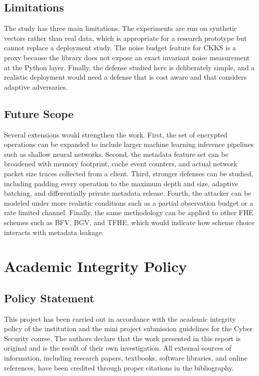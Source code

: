 \documentclass[12pt,a4paper]{article}
\begin{document}
\subsection{Limitations}
The study has three main limitations. The experiments are run on synthetic vectors rather than real data, which is appropriate for a research prototype but cannot replace a deployment study. The noise budget feature for CKKS is a proxy because the library does not expose an exact invariant noise measurement at the Python layer. Finally, the defense studied here is deliberately simple, and a realistic deployment would need a defense that is cost aware and that considers adaptive adversaries.

\subsection{Future Scope}
Several extensions would strengthen the work. First, the set of encrypted operations can be expanded to include larger machine learning inference pipelines such as shallow neural networks. Second, the metadata feature set can be broadened with memory footprint, cache event counters, and actual network packet size traces collected from a client. Third, stronger defenses can be studied, including padding every operation to the maximum depth and size, adaptive batching, and differentially private metadata release. Fourth, the attacker can be modeled under more realistic conditions such as a partial observation budget or a rate limited channel. Finally, the same methodology can be applied to other FHE schemes such as BFV, BGV, and TFHE, which would indicate how scheme choice interacts with metadata leakage.

\section{Academic Integrity Policy}

\subsection{Policy Statement}
This project has been carried out in accordance with the academic integrity policy of the institution and the mini project submission guidelines for the Cyber Security course. The authors declare that the work presented in this report is original and is the result of their own investigation. All external sources of information, including research papers, textbooks, software libraries, and online references, have been credited through proper citations in the bibliography.
\end{document}
